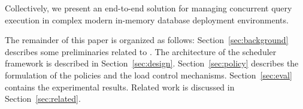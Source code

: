 Collectively, we present an end-to-end solution for managing concurrent query execution in complex modern in-memory database deployment environments.

The remainder of this paper is organized as follows: Section~\ref{sec:background} describes some preliminaries related to \sys{}. 
The architecture of the scheduler framework is described in Section~\ref{sec:design}. 
Section~\ref{sec:policy} describes the  formulation of the policies and the load control mechanisms.
Section~\ref{sec:eval} contains the experimental results. Related work is discussed in Section~\ref{sec:related}.